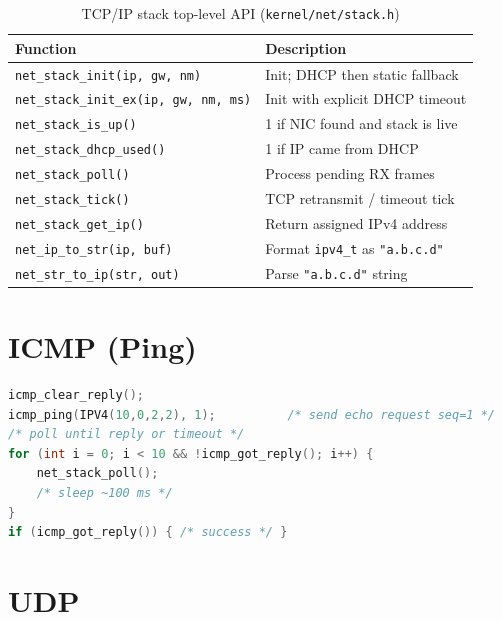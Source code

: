 \documentclass[11pt,a4paper]{report}
\begin{document}
\begin{table}[h]
\centering
\begin{tabular}{ll}
\toprule
\textbf{Function} & \textbf{Description} \\
\midrule
\texttt{net\_stack\_init(ip, gw, nm)} & Init; DHCP then static fallback \\
\texttt{net\_stack\_init\_ex(ip, gw, nm, ms)} & Init with explicit DHCP timeout \\
\texttt{net\_stack\_is\_up()} & 1 if NIC found and stack is live \\
\texttt{net\_stack\_dhcp\_used()} & 1 if IP came from DHCP \\
\texttt{net\_stack\_poll()} & Process pending RX frames \\
\texttt{net\_stack\_tick()} & TCP retransmit / timeout tick \\
\texttt{net\_stack\_get\_ip()} & Return assigned IPv4 address \\
\texttt{net\_ip\_to\_str(ip, buf)} & Format \texttt{ipv4\_t} as \texttt{"a.b.c.d"} \\
\texttt{net\_str\_to\_ip(str, out)} & Parse \texttt{"a.b.c.d"} string \\
\bottomrule
\end{tabular}
\caption{TCP/IP stack top-level API (\texttt{kernel/net/stack.h})}
\end{table}

\section{ICMP (Ping)}

\begin{lstlisting}[language=C]
icmp_clear_reply();
icmp_ping(IPV4(10,0,2,2), 1);          /* send echo request seq=1 */
/* poll until reply or timeout */
for (int i = 0; i < 10 && !icmp_got_reply(); i++) {
    net_stack_poll();
    /* sleep ~100 ms */
}
if (icmp_got_reply()) { /* success */ }
\end{lstlisting}

\section{UDP}
\end{document}
